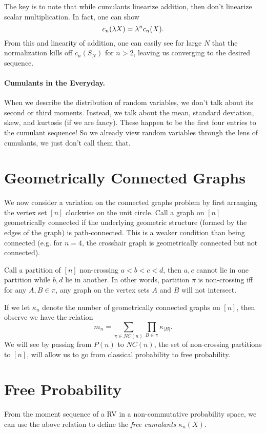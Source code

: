 The key is to note that while cumulants linearize addition, then don't linearize scalar multiplication. In fact, one can show
\[
    c_n(\lambda X) = \lambda^nc_n(X).
\]
From this and linearity of addition, one can easily see for large $N$ that the normalization kills off $c_n(S_N)$ for $n > 2$, leaving us converging to the desired sequence.

\paragraph{Cumulants in the Everyday.} When we describe the distribution of random variables, we don't talk about its second or third moments. Instead, we talk about the mean, standard deviation, skew, and kurtosis (if we are fancy). These happen to be the first four entries to the cumulant sequence! So we already view random variables through the lens of cumulants, we just don't call them that.

\section*{Geometrically Connected Graphs}
We now consider a variation on the connected graphs problem by first arranging the vertex set $[n]$ clockwise on the unit circle. Call a graph on $[n]$ geometrically connected if the underlying geometric structure (formed by the edges of the graph) is path-connected. This is a weaker condition than being connected (e.g. for $n = 4$, the crosshair graph is geometrically connected but not connected).

Call a partition of $[n]$ non-crossing $a < b < c < d$, then $a, c$ cannot lie in one partition while $b, d$ lie in another. In other words, partition $\pi$ is non-crossing iff for any $A, B \in \pi$, any graph on the vertex sets $A$ and $B$ will not intersect.

If we let $\kappa_n$ denote the number of geometrically connected graphs on $[n]$, then observe we have the relation
\[
    m_n = \sum_{\pi \in NC(n)} \prod_{B \in \pi} \kappa_{|B|}.
\]
We will see by passing from $P(n)$ to $NC(n)$, the set of non-crossing partitions to $[n]$, will allow us to go from classical probability to free probability.

\section*{Free Probability}
From the moment sequence of a RV in a non-commutative probability space, we can use the above relation to define the \textit{free cumulants} $\kappa_n(X)$.


